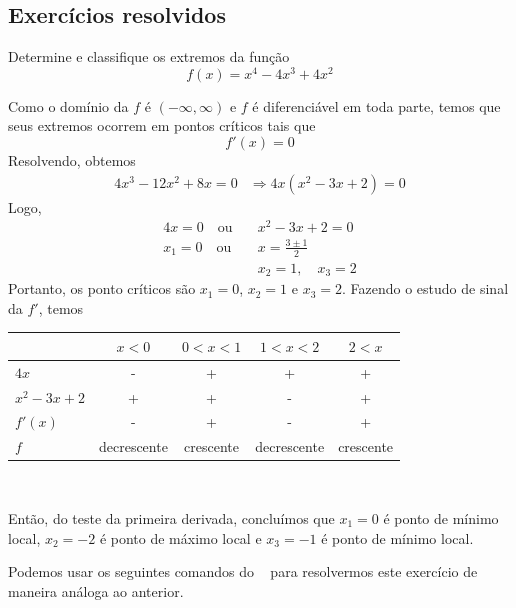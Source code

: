 \cleardoublepage\documentclass[../main.tex]{subfiles}
\begin{document}
\subsection{Exercícios resolvidos}
\begin{exeresol}
  Determine e classifique os extremos da função
  \begin{equation*}
    f(x) = x^4 - 4x^3 + 4x^2
  \end{equation*}
\end{exeresol}
\begin{resol}
  Como o domínio da $f$ é $(-\infty, \infty)$ e $f$ é diferenciável em toda parte, temos que seus extremos ocorrem em pontos críticos tais que
  \begin{equation*}
    f'(x)=0
  \end{equation*}
  Resolvendo, obtemos
  \begin{align*}
    4x^3-12x^2+8x=0 &\Rightarrow 4x(x^2-3x+2)=0
  \end{align*}
  Logo,
  \begin{align*}
    4x=0 \quad\text{ou}\quad &x^2-3x+2=0\\
    x_1 = 0  \quad\text{ou}\quad     &x = \frac{3\pm 1}{2} \\
                             &x_2 = 1,\quad x_3=2
  \end{align*}
  Portanto, os ponto críticos são $x_1=0$, $x_2=1$ e $x_3=2$. Fazendo o estudo de sinal da $f'$, temos
  \begin{center}
    \begin{tabular}{lcccc}\hline
                 & $x<0$ & $0<x<1$ & $1<x<2$ & $2<x$ \\\hline
      $4x$       & -       &     +       &     +      &   +  \\
      $x^2-3x+2$ & +       &     +       &     -      &   +   \\
      $f'(x)$    & -       &     +       &     -      &   +   \\
      $f$        & decrescente & crescente & decrescente & crescente \\\hline
    \end{tabular}\\
  \end{center}
  Então, do teste da primeira derivada, concluímos que $x_1=0$ é ponto de mínimo local, $x_2=-2$ é ponto de máximo local e $x_3=-1$ é ponto de mínimo local.

  
  Podemos usar os seguintes comandos do \geogebra~ para resolvermos este exercício de maneira análoga ao anterior.
\end{resol}
\end{document}
